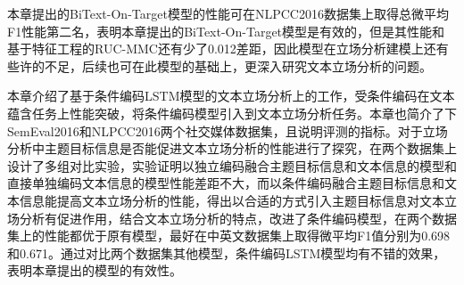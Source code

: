 本章提出的BiText-On-Target模型的性能可在NLPCC2016数据集上取得总微平均F1性能第二名，表明本章提出的BiText-On-Target模型是有效的，但是其性能和基于特征工程的RUC-MMC还有少了0.012差距，因此模型在立场分析建模上还有些许的不足，后续也可在此模型的基础上，更深入研究文本立场分析的问题。



本章介绍了基于条件编码LSTM模型的文本立场分析上的工作，受条件编码在文本蕴含任务上性能突破，将条件编码模型引入到文本立场分析任务。本章也简介了下SemEval2016和NLPCC2016两个社交媒体数据集，且说明评测的指标。对于立场分析中主题目标信息是否能促进文本立场分析的性能进行了探究，在两个数据集上设计了多组对比实验，实验证明以独立编码融合主题目标信息和文本信息的模型和直接单独编码文本信息的模型性能差距不大，而以条件编码融合主题目标信息和文本信息能提高文本立场分析的性能，得出以合适的方式引入主题目标信息对文本立场分析有促进作用，结合文本立场分析的特点，改进了条件编码模型，在两个数据集上的性能都优于原有模型，最好在中英文数据集上取得微平均F1值分别为0.698和0.671。通过对比两个数据集其他模型，条件编码LSTM模型均有不错的效果，表明本章提出的模型的有效性。

